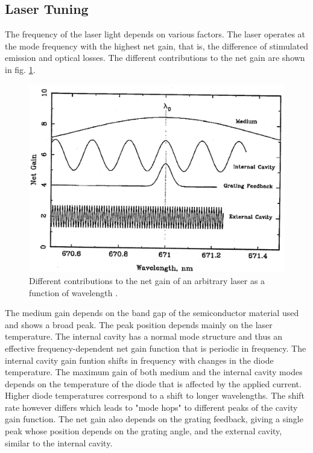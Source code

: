 \subsection*{Laser Tuning}
The frequency of the laser light depends on various factors. The laser operates at the mode frequency with the 
highest net gain, that is, the difference of stimulated emission and optical losses.
The different contributions to the net gain are shown in fig. \ref{fig:netgain}.
\begin{figure}
    \centering
    \includegraphics[width = 0.6\linewidth]{Bilder/netgain.png}
    \caption{Different contributions to the net gain of an arbitrary laser as a function of wavelength \cite{sample}.}
    \label{fig:netgain}
\end{figure}
The medium gain depends on the band gap of the semiconductor material used and shows a broad peak. The 
peak position depends mainly on the laser temperature.
The internal cavity has a normal mode structure and thus an effective frequency-dependent net gain function that is 
periodic in frequency. The internal cavity gain funtion shifts in frequency with changes in the diode temperature.
The maximum gain of both medium and the internal cavity modes depends on the temperature of the diode that is affected by 
the applied current. Higher diode temperatures correspond to a shift to longer wavelengths. The shift rate however differs 
which leads to "mode hops" to different peaks of the cavity gain function.
The net gain also depends on the grating feedback, giving a single peak whose position depends on the grating angle, and
the external cavity, similar to the internal cavity.

